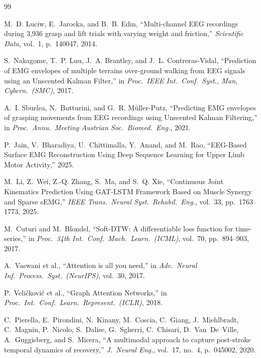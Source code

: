 \documentclass[12pt, a4paper]{article}
\begin{document}
	
	\begin{thebibliography}{99}
		
		M.~D. Luciw, E.~Jarocka, and B.~B. Edin,
		``Multi-channel EEG recordings during 3,936 grasp and lift trials with
		varying weight and friction,''
		\textit{Scientific Data}, vol.~1, p.~140047, 2014.
		
		S.~Nakagome, T.~P. Luu, J.~A. Brantley, and J.~L. Contreras-Vidal,
		``Prediction of EMG envelopes of multiple terrains over-ground walking
		from EEG signals using an Unscented Kalman Filter,''
		in \textit{Proc.\ IEEE Int.\ Conf.\ Syst., Man, Cybern.\ (SMC)}, 2017.
		
		A.~I. Sburlea, N.~Butturini, and G.~R. M\"{u}ller-Putz,
		``Predicting EMG envelopes of grasping movements from EEG recordings
		using Unscented Kalman Filtering,''
		in \textit{Proc.\ Annu.\ Meeting Austrian Soc.\ Biomed.\ Eng.}, 2021.
		
		P.~Jain, V.~Bharadiya, U.~Chittimalla, Y.~Anand, and M.~Rao,
		``EEG-Based Surface EMG Reconstruction Using Deep Sequence Learning for
		Upper Limb Motor Activity,'' 2025.
		
		M.~Li, Z.~Wei, Z.-Q. Zhang, S.~Ma, and S.~Q. Xie,
		``Continuous Joint Kinematics Prediction Using GAT-LSTM Framework Based
		on Muscle Synergy and Sparse sEMG,''
		\textit{IEEE Trans.\ Neural Syst.\ Rehabil.\ Eng.}, vol.~33, pp.~1763--1773,
		2025.
		
		M.~Cuturi and M.~Blondel,
		``Soft-DTW: A differentiable loss function for time-series,''
		in \textit{Proc.\ 34th Int.\ Conf.\ Mach.\ Learn.\ (ICML)},
		vol.~70, pp.~894--903, 2017.
		
		A.~Vaswani et al.,
		``Attention is all you need,''
		in \textit{Adv.\ Neural Inf.\ Process.\ Syst.\ (NeurIPS)}, vol.~30, 2017.
		
		P.~Veli\v{c}kovi\'{c} et al.,
		``Graph Attention Networks,''
		in \textit{Proc.\ Int.\ Conf.\ Learn.\ Represent.\ (ICLR)}, 2018.
		
		C.~Pierella, E.~Pirondini, N.~Kinany, M.~Coscia, C.~Giang,
		J.~Miehlbradt, C.~Magnin, P.~Nicolo, S.~Dalise, G.~Sgherri,
		C.~Chisari, D.~Van~De~Ville, A.~Guggisberg, and S.~Micera,
		``A multimodal approach to capture post-stroke temporal dynamics
		of recovery,''
		\textit{J.\ Neural Eng.}, vol.~17, no.~4, p.~045002, 2020.
		

\end{thebibliography}
\end{document}
